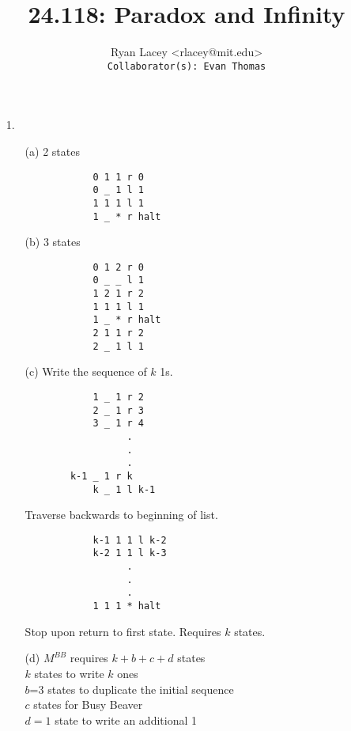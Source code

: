 \documentclass{article}
\begin{document}

\title{24.118: Paradox and Infinity}
\author{
  Ryan Lacey <rlacey@mit.edu>\\
  \footnotesize \texttt{Collaborator(s): Evan Thomas}
}
        
\maketitle
        


\begin{enumerate}
\item[1.]
	\begin{enumerate}
		\item[(a)]
			2 states\\
			\begin{verbatim}
			0 1 1 r 0
			0 _ 1 l 1
			1 1 1 l 1
			1 _ * r halt
			\end{verbatim}
		\bigskip
		\item[(b)]
			3 states\\
			\begin{verbatim}
			0 1 2 r 0
			0 _ _ l 1
			1 2 1 r 2 
			1 1 1 l 1
			1 _ * r halt
			2 1 1 r 2
			2 _ 1 l 1
			\end{verbatim}
		\item[(c)]
			Write the sequence of $k$ 1s.\\
			\begin{verbatim}
			1 _ 1 r 2
			2 _ 1 r 3
			3 _ 1 r 4 
			      .
			      .
			      .
		k-1 _ 1 r k
			k _ 1 l k-1
			\end{verbatim}
			Traverse backwards to beginning of list.\\
			\begin{verbatim}
			k-1 1 1 l k-2
			k-2 1 1 l k-3
			      .
			      .
			      .
			1 1 1 * halt
			\end{verbatim}
			Stop upon return to first state. Requires $k$ states.\\
		\item[(d)]
			$M^{BB}$ requires $k+b+c+d$ states\\
			
			 $k$ states to write $k$ ones\\
			 $b$=3 states to duplicate the initial sequence\\
			 $c$ states for Busy Beaver\\
			 $d=1$ state to write an additional 1
	\end{enumerate}


\end{enumerate}
\end{document}

